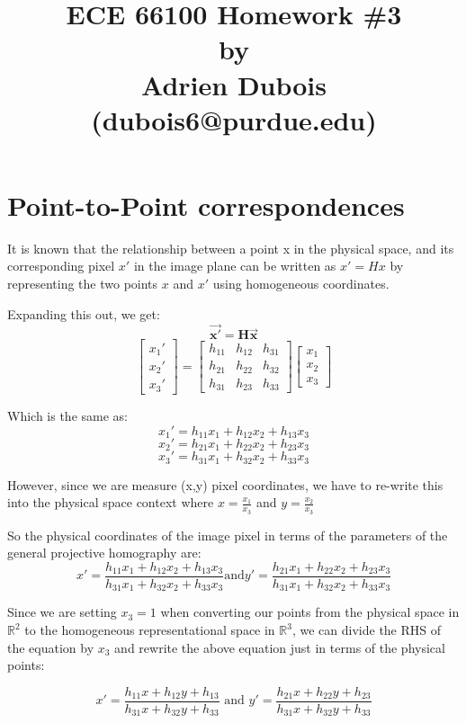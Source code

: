 \documentclass{article}
\title{\Large \textbf{ECE 66100 Homework \#3\\[0.1in] by\\ [0.1in] Adrien Dubois (dubois6@purdue.edu)}}
\begin{document}
\maketitle
\section{Point-to-Point correspondences}\label{sec:point-matches}
It is known that the relationship between a point x in the physical space, and its corresponding pixel $x'$ in the image plane can be written as \(x' = Hx\) by representing the two points $x$ and $x'$ using homogeneous coordinates.


Expanding this out, we get:
\[\boldsymbol{\Vec{x'}} = \boldsymbol{H} \boldsymbol{\Vec{x}}\]
\[
\begin{bmatrix}
    x_1' \\ x_2' \\ x_3'
\end{bmatrix} = \begin{bmatrix}
    h_{11} & h_{12} & h_{31} \\
    h_{21} & h_{22} & h_{32} \\
    h_{31} & h_{23} & h_{33}
\end{bmatrix} \begin{bmatrix}
    x_1 \\ x_2 \\ x_3
\end{bmatrix}
\] 

Which is the same as:
\[x_1' = h_{11} x_1 + h_{12} x_2 + h_{13} x_3\]
\[x_2' = h_{21} x_1 + h_{22} x_2 + h_{23} x_3\]
\[x_3' = h_{31} x_1 + h_{32} x_2 + h_{33} x_3\]

However, since we are measure (x,y) pixel coordinates, we have to re-write this into the physical space context where $x = \frac{x_1}{x_3}$ and $y = \frac{x_2}{x_3}$

So the physical coordinates of the image pixel in terms of the parameters of the general projective homography are:
\[x' = \frac{h_{11}x_1 + h_{12}x_2 + h_{13}x_3}{h_{31}x_1 + h_{32}x_2 + h_{33}x_3} \text{and} y' = \frac{h_{21}x_1 + h_{22}x_2 + h_{23}x_3}{h_{31}x_1 + h_{32}x_2 + h_{33}x_3}\]

Since we are setting $x_3 = 1$ when converting our points from the physical space in $\mathbb{R}^2$ to the homogeneous representational space in $\mathbb{R}^3$, we can divide the RHS of the equation by $x_3$ and rewrite the above equation just in terms of the physical points:

\[x' = \frac{h_{11}x + h_{12}y + h_{13}}{h_{31}x + h_{32}y + h_{33}} \text{ and } y' = \frac{h_{21}x + h_{22}y + h_{23}}{h_{31}x + h_{32}y + h_{33}}\]
\end{document}
